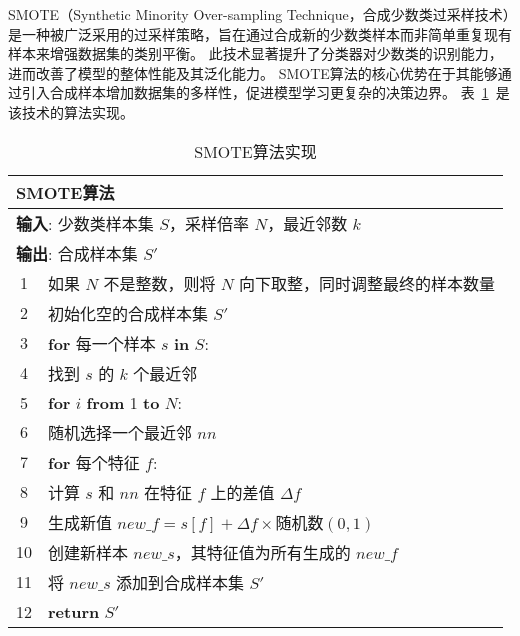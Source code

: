 SMOTE（Synthetic Minority Over-sampling Technique，合成少数类过采样技术）是一种被广泛采用的过采样策略，旨在通过合成新的少数类样本而非简单重复现有样本来增强数据集的类别平衡。
此技术显著提升了分类器对少数类的识别能力，进而改善了模型的整体性能及其泛化能力。
SMOTE算法的核心优势在于其能够通过引入合成样本增加数据集的多样性，促进模型学习更复杂的决策边界\cite{chawla2002smote}\cite{fernandez2018smote}。
表~\ref{tab:smote}~是该技术的算法实现。
\begin{table}[htbp]
  \caption{SMOTE算法实现}
  \label{tab:smote}
  \centering
  \begin{tabularx}{1.0\textwidth}{cl}
  \toprule
  \multicolumn{2}{l}{\textbf{SMOTE算法}}\\
  \midrule
  \multicolumn{2}{l}{\textbf{输入}: 少数类样本集 $S$，采样倍率 $N$，最近邻数 $k$} \\ 
  \multicolumn{2}{l}{\textbf{输出}: 合成样本集 $S'$} \\
  1& 如果 $N$ 不是整数，则将 $N$ 向下取整，同时调整最终的样本数量 \\
  2& 初始化空的合成样本集 $S'$ \\
  3& \textbf{for} 每一个样本 $s$ \textbf{in} $S$: \\
  4&\quad 找到 $s$ 的 $k$ 个最近邻 \\
  5&\quad \textbf{for} $i$ \textbf{from} 1 \textbf{to} $N$: \\
  6&\quad\quad 随机选择一个最近邻 $nn$ \\
  7&\quad\quad \textbf{for} 每个特征 $f$: \\
  8&\quad\quad\quad 计算 $s$ 和 $nn$ 在特征 $f$ 上的差值 $\Delta f$ \\
  9&\quad\quad\quad 生成新值 $new\_f = s[f] + \Delta f \times \text{随机数}(0, 1)$ \\
  10&\quad\quad 创建新样本 $new\_s$，其特征值为所有生成的 $new\_f$ \\
  11&\quad\quad 将 $new\_s$ 添加到合成样本集 $S'$ \\
  12&\textbf{return} $S'$ \\ 
  \bottomrule
  \end{tabularx}
\end{table}



